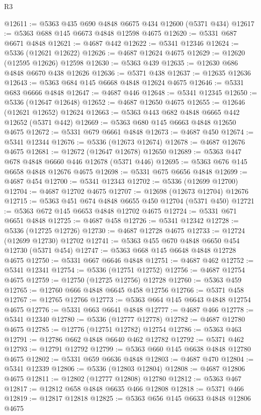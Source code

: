 \begin{lexlean}{R3}
\begin{coremodule}
@12611 := @5363 @435 @690 @4848 @6675 @434 @12600 (@5371 @434)
@12617 := @5363 @688 @145 @6673 @4848 @12598 @4675
@12620 := @5331 @687 @6671 @4848
@12621 := @4687 @442
@12622 := @5341 @12346
@12624 := @5336 (@12621 @12622)
@12626 := @4687 @12624 @4675
@12629 := @12620 (@12595 @12626) @12598
@12630 := @5363 @439
@12635 := @12630 @686 @4848 @6670 @438 @12626
@12636 := @5371 @438
@12637 := @12635 @12636
@12643 := @5363 @684 @145 @6668 @4848 @12624 @4675
@12646 := @5331 @683 @6666 @4848
@12647 := @4687 @446
@12648 := @5341 @12345
@12650 := @5336 (@12647 @12648)
@12652 := @4687 @12650 @4675
@12655 := @12646 (@12621 @12652) @12624
@12663 := @5363 @443 @682 @4848 @6665 @442 @12652 (@5371 @442)
@12669 := @5363 @680 @145 @6663 @4848 @12650 @4675
@12672 := @5331 @679 @6661 @4848
@12673 := @4687 @450
@12674 := @5341 @12344
@12676 := @5336 (@12673 @12674)
@12678 := @4687 @12676 @4675
@12681 := @12672 (@12647 @12678) @12650
@12689 := @5363 @447 @678 @4848 @6660 @446 @12678 (@5371 @446)
@12695 := @5363 @676 @145 @6658 @4848 @12676 @4675
@12698 := @5331 @675 @6656 @4848
@12699 := @4687 @454
@12700 := @5341 @12343
@12702 := @5336 (@12699 @12700)
@12704 := @4687 @12702 @4675
@12707 := @12698 (@12673 @12704) @12676
@12715 := @5363 @451 @674 @4848 @6655 @450 @12704 (@5371 @450)
@12721 := @5363 @672 @145 @6653 @4848 @12702 @4675
@12724 := @5331 @671 @6651 @4848
@12725 := @4687 @458
@12726 := @5341 @12342
@12728 := @5336 (@12725 @12726)
@12730 := @4687 @12728 @4675
@12733 := @12724 (@12699 @12730) @12702
@12741 := @5363 @455 @670 @4848 @6650 @454 @12730 (@5371 @454)
@12747 := @5363 @668 @145 @6648 @4848 @12728 @4675
@12750 := @5331 @667 @6646 @4848
@12751 := @4687 @462
@12752 := @5341 @12341
@12754 := @5336 (@12751 @12752)
@12756 := @4687 @12754 @4675
@12759 := @12750 (@12725 @12756) @12728
@12760 := @5363 @459
@12765 := @12760 @666 @4848 @6645 @458 @12756
@12766 := @5371 @458
@12767 := @12765 @12766
@12773 := @5363 @664 @145 @6643 @4848 @12754 @4675
@12776 := @5331 @663 @6641 @4848
@12777 := @4687 @466
@12778 := @5341 @12340
@12780 := @5336 (@12777 @12778)
@12782 := @4687 @12780 @4675
@12785 := @12776 (@12751 @12782) @12754
@12786 := @5363 @463
@12791 := @12786 @662 @4848 @6640 @462 @12782
@12792 := @5371 @462
@12793 := @12791 @12792
@12799 := @5363 @660 @145 @6638 @4848 @12780 @4675
@12802 := @5331 @659 @6636 @4848
@12803 := @4687 @470
@12804 := @5341 @12339
@12806 := @5336 (@12803 @12804)
@12808 := @4687 @12806 @4675
@12811 := @12802 (@12777 @12808) @12780
@12812 := @5363 @467
@12817 := @12812 @658 @4848 @6635 @466 @12808
@12818 := @5371 @466
@12819 := @12817 @12818
@12825 := @5363 @656 @145 @6633 @4848 @12806 @4675

\end{coremodule}
\end{lexlean}
